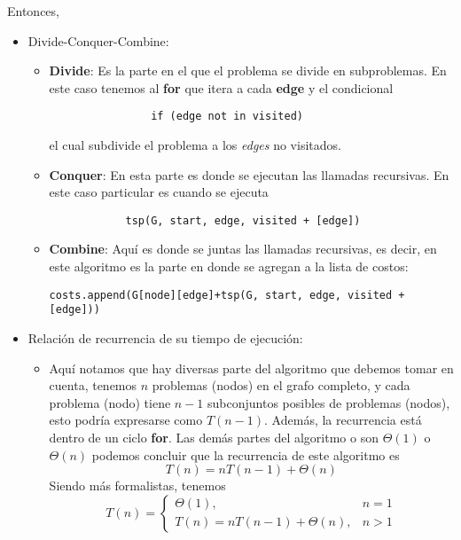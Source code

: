 \begin{problema}
Entonces, 
\begin{itemize}
    \item Divide-Conquer-Combine: 
    \begin{itemize}
        \item \textbf{Divide}: Es la parte en el que el problema se divide en subproblemas. En este caso tenemos al \textbf{for} que itera a cada \textbf{edge} y el condicional \begin{verbatim}
                if (edge not in visited)
        \end{verbatim}
        el cual subdivide el problema a los \textit{edges} no visitados. 
        \item \textbf{Conquer}: En esta parte es donde se ejecutan las llamadas recursivas. En este caso particular es cuando se ejecuta
        \begin{verbatim}
            tsp(G, start, edge, visited + [edge])
        \end{verbatim}
        \item \textbf{Combine}: Aquí es donde se juntas las llamadas recursivas, es decir, en este algoritmo es la parte en donde se agregan a la lista de costos: 
        \begin{verbatim}
costs.append(G[node][edge]+tsp(G, start, edge, visited + [edge]))
        \end{verbatim}
    \end{itemize}
    \item Relación de recurrencia de su tiempo de ejecución: 
    \begin{itemize}
        \item Aquí notamos que hay diversas parte del algoritmo que debemos tomar en cuenta,
        tenemos $n$ problemas (nodos) en el grafo completo, y cada problema (nodo) tiene $n-1$ subconjuntos posibles de problemas (nodos), esto podría expresarse como $T(n-1)$. Además, la recurrencia está dentro de un ciclo \textbf{for}. Las demás partes del algoritmo o son $\Theta(1)$ o $\Theta(n)$ podemos concluir que la recurrencia de este algoritmo es 
        $$T(n)=nT\left(n-1\right)+\Theta(n)$$
        Siendo más formalistas, tenemos 
        $$T(n)=\begin{cases}
            \Theta(1),& n=1\\
            T(n)=nT(n-1)+\Theta(n), & n>1
        \end{cases}$$


\end{itemize}
\end{itemize}
\end{problema}
